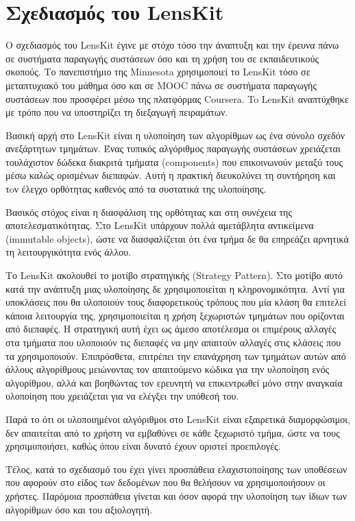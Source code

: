 \section{Σχεδιασμός του \en LensKit}
Ο σχεδιασμός του {\en LensKit} έγινε με στόχο τόσο την άναπτυξη και την έρευνα πάνω σε συστήματα παραγωγής συστάσεων όσο και τη χρήση του σε εκπαιδευτικούς σκοπούς. Το πανεπιστήμιο της {\en Minnesota} χρησιμοποιεί το {\en LensKit} τόσο σε μεταπτυχιακό του μάθημα όσο και σε {\en MOOC} πάνω σε συστήματα παραγωγής συστάσεων που προσφέρει μέσω της πλατφόρμας {\en Coursera}. To {\en LensKit} αναπτύχθηκε με τρόπο που να υποστηρίζει τη διεξαγωγή πειραμάτων.\cite{Konstan:2015:TRS:2744768.2728171} \par
Βασική αρχή στο {\en LensKit} είναι η υλοποίηση των αλγορίθμων ως ένα σύνολο σχεδόν ανεξάρτητων τμημάτων. Ένας τυπικός αλγόριθμος παραγωγής συστάσεων χρειάζεται τουλάχιστον δώδεκα διακριτά τμήματα ({\en components}) που επικοινωνούν μεταξύ τους μέσω καλώς ορισμένων διεπαφών. Αυτή η πρακτική διευκολύνει τη συντήρηση και τoν έλεγχο ορθότητας καθενός από τα συστατικά της υλοποίησης. \par
Βασικός στόχος είναι η διασφάλιση της ορθότητας και στη συνέχεια της αποτελεσματικότητας. Στο {\en LensKit} υπάρχουν πολλά αμετάβλητα αντικείμενα ({\en immutable objects}), ώστε να διασφαλίζεται ότι ένα τμήμα δε θα επηρεάζει αρνητικά τη λειτουργικότητα ενός άλλου. \par
Το {\en LensKit} ακολουθεί το μοτίβο στρατηγικής ({\en Strategy Pattern}). Στο μοτίβο αυτό κατά την ανάπτυξη μιας υλοποίησης δε χρησιμοποιείται η κληρονομικότητα. Αντί για υποκλάσεις που θα υλοποιούν τους διαφορετικούς τρόπους που μία κλάση θα επιτελεί κάποια λειτουργία της, χρησιμοποιείται η χρήση ξεχωριστών τμημάτων που ορίζονται από διεπαφές.\cite{Gamma:1995:DPE:186897} Η στρατηγική αυτή έχει ως άμεσο αποτέλεσμα οι επιμέρους αλλαγές στα τμήματα που υλοποιούν τις διεπαφές να μην απαιτούν αλλαγές στις κλάσεις που τα χρησιμοποιούν. Επιπρόσθετα, επιτρέπει την επανάχρηση των τμημάτων αυτών από άλλους αλγορίθμους μειώνοντας τον απαιτούμενο κώδικα για την υλοποίηση ενός αλγορίθμου, αλλά και βοηθώντας τον ερευνητή να επικεντρωθεί μόνο στην αναγκαία υλοποίηση που χρειάζεται για να ελέγξει την υπόθεσή του. \par
Παρά το ότι οι υλοποιημένοι αλγόριθμοι στο {\en LensKit} είναι εξαιρετικά διαμορφώσιμοι, δεν απαιτείται από το χρήστη να εμβαθύνει σε κάθε ξεχωριστό τμήμα, ώστε να τους χρησιμοποιήσει, καθώς όπου είναι δυνατό έχουν οριστεί προεπιλογές. 
\par Τέλος, κατά το σχεδιασμό του έχει γίνει προσπάθεια ελαχιστοποίησης των υποθέσεων που αφορούν στο είδος των δεδομένων που θα θελήσουν να χρησιμοποιήσουν οι χρήστες. Παρόμοια προσπάθεια γίνεται και όσον αφορά την υλοποίηση των ίδιων των αλγορίθμων όσο και του αξιολογητή.
